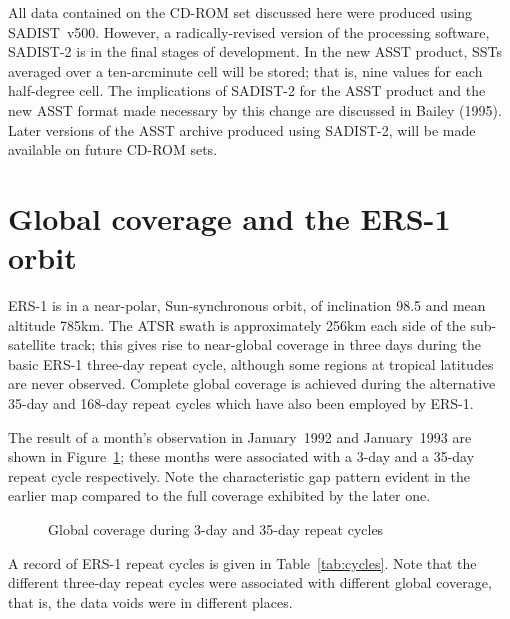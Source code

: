 All data contained on the CD-ROM set discussed here were produced using 
SADIST~v500.
However,  a radically-revised version of the processing
software, SADIST-2 is in the final stages of development.
In the new ASST product, SSTs averaged over a ten-arcminute cell 
will be stored; that is, nine values for each half-degree cell.
The implications of SADIST-2 for the ASST product and the new
ASST format made necessary by this change are discussed in 
Bailey (1995). 
Later versions of the ASST archive produced using SADIST-2, will
be made available on future CD-ROM sets.

\clearpage

\section{Global coverage and the ERS-1 orbit}
\label{app:orbit}

ERS-1 is in a near-polar, Sun-synchronous orbit, of inclination
98.5{\degree} and mean altitude 785{\thinspace}km.
The ATSR swath is approximately 256{\thinspace}km each side of the 
sub-satellite track;
this gives rise to near-global coverage in three days during the 
basic ERS-1 three-day repeat cycle, although some regions at tropical latitudes 
are never observed.
Complete global coverage is achieved during the alternative 35-day and 
168-day repeat cycles 
which have also been employed by ERS-1.

The result of a month's observation in January~1992 and January~1993
are shown in Figure~\ref{fig:repeat}; these months were associated 
with a 3-day and a 35-day repeat cycle respectively.
Note the characteristic gap pattern evident in the earlier map 
compared to the full coverage exhibited by the later one.
\begin{figure}
\caption{Global coverage during 3-day and 35-day repeat cycles}
\label{fig:repeat}
\vspace{10cm}
\end{figure}

\clearpage
A record of ERS-1 repeat cycles is given in Table~\ref{tab:cycles}.
Note that the different three-day repeat cycles were associated with
different global coverage, that is, the data voids were in  different places.

